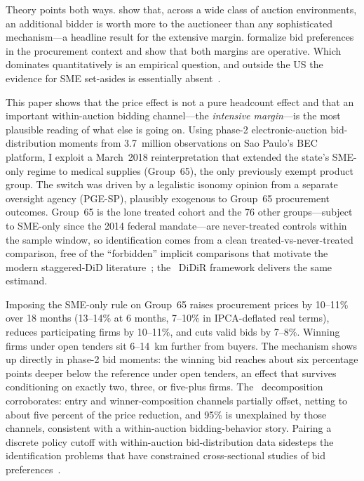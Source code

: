 Theory points both ways. \citet{bulow1996} show that, across a wide class of auction environments, an additional bidder is worth more to the auctioneer than any sophisticated mechanism---a headline result for the extensive margin. \citet{krasnokutskaya2011} formalize bid preferences in the procurement context and show that both margins are operative. Which dominates quantitatively is an empirical question, and outside the US the evidence for SME set-asides is essentially absent~\citep{nakabayashi2013, szucs2024, decarolis2024}.

This paper shows that the price effect is not a pure headcount effect and that an important within-auction bidding channel---the \emph{intensive margin}---is the most plausible reading of what else is going on. Using phase-2 electronic-auction bid-distribution moments from 3.7~million observations on Sao Paulo's BEC platform, I exploit a March~2018 reinterpretation that extended the state's SME-only regime to medical supplies (Group~65), the only previously exempt product group. The switch was driven by a legalistic isonomy opinion from a separate oversight agency (PGE-SP), plausibly exogenous to Group~65 procurement outcomes. Group~65 is the lone treated cohort and the 76 other groups---subject to SME-only since the 2014 federal mandate---are never-treated controls within the sample window, so identification comes from a clean treated-vs-never-treated comparison, free of the ``forbidden'' implicit comparisons that motivate the modern staggered-DiD literature~\citep{callaway2021,sun2021,goodmanbacon2021,borusyak2024}; the~\citet{kim2019} DiDiR framework delivers the same estimand.

Imposing the SME-only rule on Group~65 raises procurement prices by 10--11\% over 18 months (13--14\% at 6 months, 7--10\% in IPCA-deflated real terms), reduces participating firms by 10--11\%, and cuts valid bids by 7--8\%. Winning firms under open tenders sit 6--14~km further from buyers. The mechanism shows up directly in phase-2 bid moments: the winning bid reaches about six percentage points deeper below the reference under open tenders, an effect that survives conditioning on exactly two, three, or five-plus firms. The~\citet{gelbach2016} decomposition corroborates: entry and winner-composition channels partially offset, netting to about five percent of the price reduction, and 95\% is unexplained by those channels, consistent with a within-auction bidding-behavior story. Pairing a discrete policy cutoff with within-auction bid-distribution data sidesteps the identification problems that have constrained cross-sectional studies of bid preferences~\citep{marion2007, krasnokutskaya2011, athey2013}.

